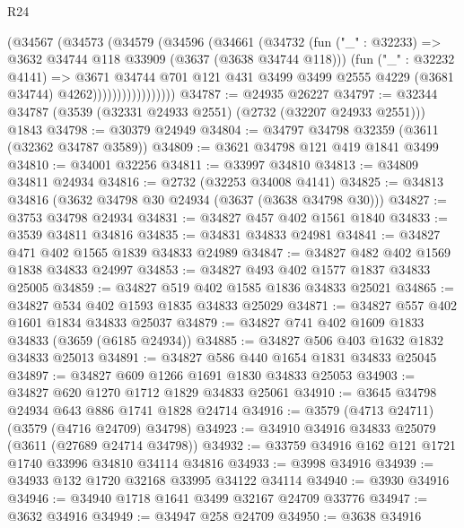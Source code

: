 \begin{lexlean}{R24}
\begin{coremodule}
                        (@34567
                          (@34573
                            (@34579
                              (@34596
                                (@34661
                                  (@34732
                                    (fun ("_" : @32233) =>
                                    @3632 @34744 @118 @33909 (@3637 (@3638 @34744 @118)))
                                    (fun ("_" : @32232 @4141) =>
                                    @3671
                                      @34744
                                      @701
                                      @121
                                      @431
                                      @3499
                                      @3499
                                      @2555
                                      @4229
                                      (@3681 @34744)
                                      @4262)))))))))))))))))
@34787 := @24935 @26227
@34797 := @32344 @34787 (@3539 (@32331 @24933 @2551) (@2732 (@32207 @24933 @2551))) @1843
@34798 := @30379 @24949
@34804 := @34797 @34798 @32359 (@3611 (@32362 @34787 @3589))
@34809 := @3621 @34798 @121 @419 @1841 @3499
@34810 := @34001 @32256
@34811 := @33997 @34810
@34813 := @34809 @34811 @24934
@34816 := @2732 (@32253 @34008 @4141)
@34825 := @34813 @34816 (@3632 @34798 @30 @24934 (@3637 (@3638 @34798 @30)))
@34827 := @3753 @34798 @24934
@34831 := @34827 @457 @402 @1561 @1840
@34833 := @3539 @34811 @34816
@34835 := @34831 @34833 @24981
@34841 := @34827 @471 @402 @1565 @1839 @34833 @24989
@34847 := @34827 @482 @402 @1569 @1838 @34833 @24997
@34853 := @34827 @493 @402 @1577 @1837 @34833 @25005
@34859 := @34827 @519 @402 @1585 @1836 @34833 @25021
@34865 := @34827 @534 @402 @1593 @1835 @34833 @25029
@34871 := @34827 @557 @402 @1601 @1834 @34833 @25037
@34879 := @34827 @741 @402 @1609 @1833 @34833 (@3659 (@6185 @24934))
@34885 := @34827 @506 @403 @1632 @1832 @34833 @25013
@34891 := @34827 @586 @440 @1654 @1831 @34833 @25045
@34897 := @34827 @609 @1266 @1691 @1830 @34833 @25053
@34903 := @34827 @620 @1270 @1712 @1829 @34833 @25061
@34910 := @3645 @34798 @24934 @643 @886 @1741 @1828 @24714
@34916 := @3579 (@4713 @24711) (@3579 (@4716 @24709) @34798)
@34923 := @34910 @34916 @34833 @25079 (@3611 (@27689 @24714 @34798))
@34932 := @33759 @34916 @162 @121 @1721 @1740 @33996 @34810 @34114 @34816
@34933 := @3998 @34916
@34939 := @34933 @132 @1720 @32168 @33995 @34122 @34114
@34940 := @3930 @34916
@34946 := @34940 @1718 @1641 @3499 @32167 @24709 @33776
@34947 := @3632 @34916
@34949 := @34947 @258 @24709
@34950 := @3638 @34916

\end{coremodule}
\end{lexlean}
